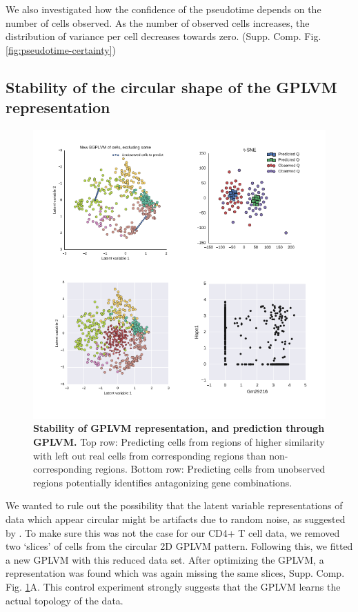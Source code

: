 We also investigated how the confidence of the pseudotime depends on the number of cells observed. As the number of observed cells increases, the distribution of variance per cell decreases towards zero. (Supp. Comp. Fig. \ref{fig:pseudotime-certainty})

\subsection{Stability of the circular shape of the GPLVM representation}

\begin{figure}
    \centering
    \includegraphics[width=\textwidth]{"fig-prediction"}
    \caption[Stability of GPLVM representation, and prediction through GPLVM]{\textbf{Stability of GPLVM representation, and prediction through GPLVM.} Top row: Predicting cells from regions of higher similarity with left out real cells from corresponding regions than non-corresponding regions. Bottom row: Predicting cells from unobserved regions potentially identifies antagonizing gene combinations.}
    \label{fig:prediction}
\end{figure}

We wanted to rule out the possibility that the latent variable representations of data which appear circular might be artifacts due to random noise, as suggested by \cite{Diaconis2008-lp}. To make sure this was not the case for our CD4+ T cell data, we removed two `slices' of cells from the circular 2D GPLVM pattern. Following this, we fitted a new GPLVM with this reduced data set. After optimizing the GPLVM, a representation was found which was again missing the same slices, Supp. Comp. Fig. \ref{fig:prediction}A. This control experiment strongly suggests that the GPLVM learns the actual topology of the data.

